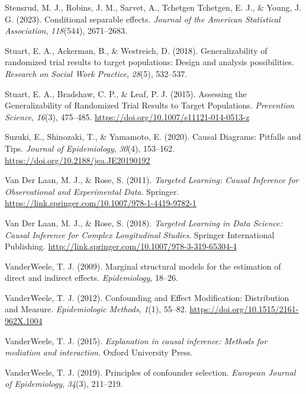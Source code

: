 \documentclass[
  single column]{article}
\newlength{\cslhangindent}
\newenvironment{CSLReferences}[2] %
 {\begin{list}{}{%
  \setlength{\itemindent}{0pt}
  \setlength{\leftmargin}{0pt}
  \setlength{\parsep}{0pt}
  \ifodd #1
   \setlength{\leftmargin}{\cslhangindent}
   \setlength{\itemindent}{-1\cslhangindent}
  \fi
  \setlength{\itemsep}{#2\baselineskip}}}
 {\end{list}}
\begin{document}
\begin{CSLReferences}{1}{0}
Stensrud, M. J., Robins, J. M., Sarvet, A., Tchetgen Tchetgen, E. J., \&
Young, J. G. (2023). Conditional separable effects. \emph{Journal of the
American Statistical Association}, \emph{118}(544), 2671--2683.

Stuart, E. A., Ackerman, B., \& Westreich, D. (2018). Generalizability
of randomized trial results to target populations: Design and analysis
possibilities. \emph{Research on Social Work Practice}, \emph{28}(5),
532--537.

Stuart, E. A., Bradshaw, C. P., \& Leaf, P. J. (2015). Assessing the
Generalizability of Randomized Trial Results to Target Populations.
\emph{Prevention Science}, \emph{16}(3), 475--485.
\url{https://doi.org/10.1007/s11121-014-0513-z}

Suzuki, E., Shinozaki, T., \& Yamamoto, E. (2020). Causal Diagrams:
Pitfalls and Tips. \emph{Journal of Epidemiology}, \emph{30}(4),
153--162. \url{https://doi.org/10.2188/jea.JE20190192}

Van Der Laan, M. J., \& Rose, S. (2011). \emph{Targeted Learning: Causal
Inference for Observational and Experimental Data}. Springer.
\url{https://link.springer.com/10.1007/978-1-4419-9782-1}

Van Der Laan, M. J., \& Rose, S. (2018). \emph{Targeted Learning in Data
Science: Causal Inference for Complex Longitudinal Studies}. Springer
International Publishing.
\url{http://link.springer.com/10.1007/978-3-319-65304-4}

VanderWeele, T. J. (2009). Marginal structural models for the estimation
of direct and indirect effects. \emph{Epidemiology}, 18--26.

VanderWeele, T. J. (2012). Confounding and Effect Modification:
Distribution and Measure. \emph{Epidemiologic Methods}, \emph{1}(1),
55--82. \url{https://doi.org/10.1515/2161-962X.1004}

VanderWeele, T. J. (2015). \emph{Explanation in causal inference:
Methods for mediation and interaction}. Oxford University Press.

VanderWeele, T. J. (2019). Principles of confounder selection.
\emph{European Journal of Epidemiology}, \emph{34}(3), 211--219.


\end{CSLReferences}
\end{document}
